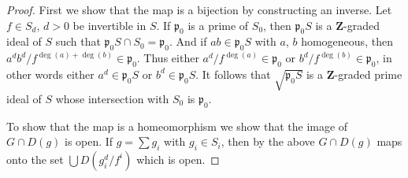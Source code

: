 \documentclass[10pt,a4paper]{amsart}
\theoremstyle{plain}
\theoremstyle{definition}
\theoremstyle{remark}
\numberwithin{equation}{subsection}
\begin{document}
\begin{proof}
First we show that the map is a bijection by constructing an inverse.
Let $f \in S_d$, $d > 0$ be invertible in $S$.
If $\mathfrak p_0$ is a prime of $S_0$, then $\mathfrak p_0S$
is a $\mathbf{Z}$-graded ideal of $S$ such that
$\mathfrak p_0S \cap S_0 = \mathfrak p_0$. And if $ab \in \mathfrak p_0S$
with $a$, $b$ homogeneous, then
$a^db^d/f^{\deg(a) + \deg(b)} \in \mathfrak p_0$.
Thus either $a^d/f^{\deg(a)} \in \mathfrak p_0$ or
$b^d/f^{\deg(b)} \in \mathfrak p_0$, in other words either
$a^d \in \mathfrak p_0S$ or $b^d \in \mathfrak p_0S$.
It follows that $\sqrt{\mathfrak p_0S}$ is a $\mathbf{Z}$-graded
prime ideal of $S$ whose intersection with $S_0$ is $\mathfrak p_0$.

\medskip\noindent
To show that the map is a homeomorphism we show that
the image of $G \cap D(g)$ is open. If $g = \sum g_i$
with $g_i \in S_i$, then by the above $G \cap D(g)$
maps onto the set $\bigcup D(g_i^d/f^i)$ which is open.
\end{proof}
\end{document}
